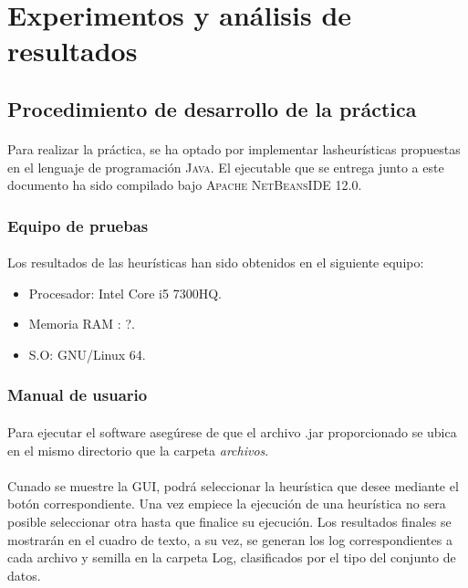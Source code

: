 \documentclass{article}
\begin{document}
	\section{Experimentos y análisis de resultados}
	
	\subsection{Procedimiento de desarrollo de la práctica}
	
	\paragraph{}Para realizar la práctica, se ha optado por implementar lasheurísticas propuestas en el lenguaje de programación \textsc{Java}. El ejecutable que se entrega junto a este documento ha sido compilado bajo \textsc{ Apache NetBeansIDE 12.0}.
	
	\subsubsection{Equipo de pruebas}
	
	\paragraph{}Los resultados de las heurísticas han sido obtenidos en el siguiente equipo:
	
		\begin{itemize}
			
			\item Procesador: Intel Core i5 7300HQ.
			\item Memoria RAM : ?.
			\item S.O: GNU/Linux 64.
			
		\end{itemize}

	\subsubsection{Manual de usuario}
	
		\paragraph{}Para ejecutar el software asegúrese de que el archivo .jar proporcionado se ubica en el mismo directorio que la carpeta \emph{archivos}. 
		
		\paragraph{}Cunado se muestre la GUI, podrá seleccionar la heurística que desee mediante el botón correspondiente. Una vez empiece la ejecución de una heurística no sera posible seleccionar otra hasta que finalice su ejecución. Los resultados finales se mostrarán en el cuadro de texto, a su vez, se generan los log correspondientes a cada archivo y semilla en la carpeta Log, clasificados por el tipo del conjunto de datos.
	
\end{document}
